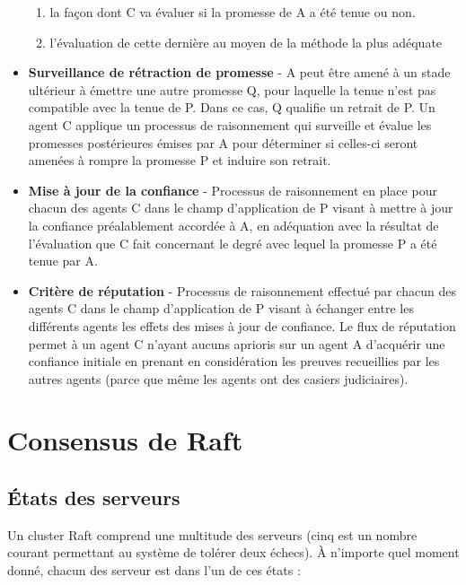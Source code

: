 \begin{itemize}
  	\begin{enumerate}
	  \item la façon dont C va évaluer si la promesse de A a été tenue ou
		  non.
      \item l'évaluation de cette dernière au moyen de la méthode la plus
          adéquate
  	\end{enumerate}
  \item \textbf{Surveillance de rétraction de promesse} -
	A peut être amené à un stade ultérieur à émettre une autre promesse Q,
	pour laquelle la tenue n'est pas compatible avec la tenue de P. Dans ce
	cas, Q qualifie un retrait de P. Un agent C applique un processus de
	raisonnement qui surveille et évalue les promesses postérieures émises
	par A pour déterminer si celles-ci seront amenées à rompre la promesse P
	et induire son retrait.
  \item \textbf{Mise à jour de la confiance} -
	Processus de raisonnement en place pour chacun des agents C dans le champ
	d'application de P visant à mettre à jour la confiance préalablement
	accordée à A, en adéquation avec la résultat de l'évaluation que C fait
	concernant le degré avec lequel la promesse P a été tenue par A.
  \item \textbf{Critère de réputation} -
	Processus de raisonnement effectué par chacun des agents C dans le champ
	d'application de P visant à échanger entre les différents agents les
	effets des mises à jour de confiance. Le flux de réputation permet à un
	agent C n'ayant aucuns aprioris sur un agent A d'acquérir une confiance
	initiale en prenant en considération les preuves recueillies par les
    autres agents (parce que même les agents ont des casiers judiciaires).
\end{itemize}


\chapter{Consensus de Raft}
\label{appendix:consensus}

\section{États des serveurs}

Un cluster Raft comprend une multitude des serveurs (cinq est un nombre courant
permettant au système de tolérer deux échecs). À n'importe quel moment donné,
chacun des serveur est dans l'un de ces états :

